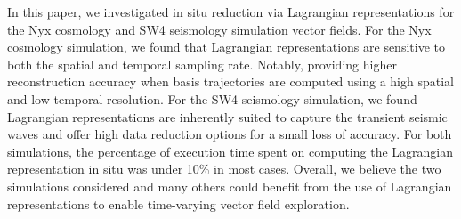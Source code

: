 In this paper, we investigated in situ reduction via Lagrangian representations for the Nyx cosmology and SW4 seismology simulation vector fields.
%
%
For the Nyx cosmology simulation, we found that Lagrangian representations are sensitive to both the spatial and temporal sampling rate.
%
Notably, providing higher reconstruction accuracy when basis trajectories are computed using a high spatial and low temporal resolution.
%
For the SW4 seismology simulation, we found Lagrangian representations are inherently suited to capture the transient seismic waves and offer high data reduction options for a small loss of accuracy.
%
For both simulations, the percentage of execution time spent on computing the Lagrangian representation in situ was under 10\% in most cases.
%
Overall, we believe the two simulations considered and many others could benefit from the use of Lagrangian representations to enable time-varying vector field exploration. 
